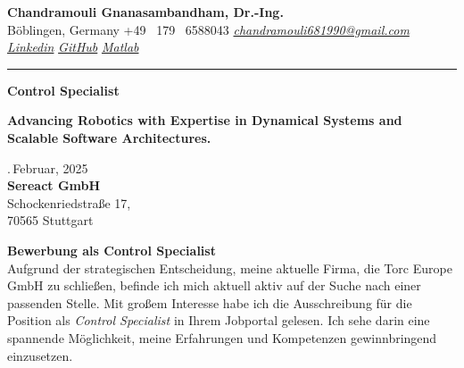 \documentclass[a4paper,10pt]{article}
\newcommand{\link}[1]{{\textit{#1}}}
\begin{document}
\thispagestyle{plain}

\begin{center}
    {\Large \textbf{Chandramouli Gnanasambandham, Dr.-Ing.}}\\ 
    
    \vspace{0.2cm}
    \small B\"oblingen, Germany \hfill  \bullet  \hfill  +49 \ 179 \ 6588043 \hfill \bullet  \hfill
    \textup{\href{mailto:chandramouli681990@gmail.com}{\link{chandramouli681990@gmail.com}}} \hfill \bullet \hfill
    \textup{\href{https://www.linkedin.com/in/ganasambandhamc/}{\link{Linkedin}}} \hfill \bullet \hfill
    \textup{\href{https://github.com/chandramouli6890}{\link{GitHub}}} \hfill \bullet \hfill
    \textup{\href{https://de.mathworks.com/matlabcentral/profile/authors/4267772}{\link{Matlab}}}

    \vspace{-0.2cm}
    {\rule{\linewidth}{0.8pt}}

    \vspace{0.2cm}
    {\Large \textbf{Control Specialist}}
    
    \vspace{0.1cm}
    \colorbox{gray!40}{%
        \parbox{0.99\textwidth}{%
            \centering \textcolor{highlightcolor}{\textbf{Advancing Robotics with Expertise in Dynamical Systems and Scalable Software Architectures.}}
        }%
    }
\end{center}

\vspace{0.5cm}
.\,Februar, 2025\\

{\noindent
\textbf{Sereact GmbH}\\
Schockenriedstraße 17,\\
70565 Stuttgart\\
}

\noindent \textbf{Bewerbung als Control Specialist} \\

\noindent Aufgrund der strategischen Entscheidung, meine aktuelle Firma, die
Torc Europe GmbH zu schließen, befinde ich mich aktuell aktiv auf der Suche
nach einer passenden Stelle. Mit großem Interesse habe ich die Ausschreibung
für die Position als \textit{Control Specialist} in Ihrem Jobportal
gelesen. Ich sehe darin eine spannende Möglichkeit, meine Erfahrungen und
Kompetenzen gewinnbringend einzusetzen. \\
\end{document}
